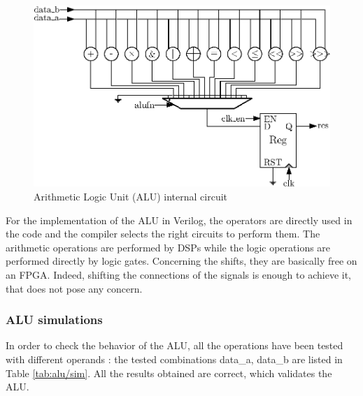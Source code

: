 \begin{figure}[H]
    \centering
    \includegraphics[width=\linewidth]{Chapter3-CPU/res/alu_internal}
    \caption{Arithmetic Logic Unit (ALU) internal circuit}
    \label{fig:components/alu_in}
\end{figure}


For the implementation of the ALU in Verilog, the operators are directly used in the code and the 
compiler selects the right circuits to perform them. The arithmetic operations are 
performed by DSPs while the logic operations are performed directly by logic gates. Concerning the
shifts, they are basically free on an FPGA. Indeed, shifting the 
connections of the signals is enough to achieve it, that does not pose any concern.

\subsubsection*{ALU simulations}

In order to check the behavior of the ALU, all the operations have been tested with different 
operands : the tested combinations data\_a, data\_b are listed in Table \ref{tab:alu/sim}. 
All the results obtained are correct, which validates the ALU.

